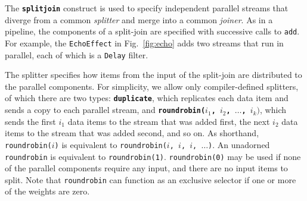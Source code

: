 
The \textbf{\texttt{splitjoin}} construct is used to specify
independent parallel streams that diverge from a common
\emph{splitter} and merge into a common \emph{joiner}.  As in a
pipeline, the components of a split-join are specified with successive
calls to \texttt{add}.  For example, the \texttt{EchoEffect} in
Fig.~\ref{fig:echo} adds two streams that run in parallel, each of
which is a \texttt{Delay} filter.

The splitter specifies how items from the input of the split-join are
distributed to the parallel components.  For simplicity, we allow only
compiler-defined splitters, of which there are two types:
\textbf{\texttt{duplicate}}, which replicates each data item and sends
a copy to each parallel stream, and \textbf{\texttt{roundrobin($i_1$,
    $i_2$, $\dots$, $i_k)$}}, which sends the first $i_1$ data items
to the stream that was added first, the next $i_2$ data items to the
stream that was added second, and so on.  As shorthand,
\texttt{roundrobin($i$)} is equivalent to \texttt{roundrobin($i$, $i$,
  $i$, $\dots$)}.  An unadorned \texttt{roundrobin} is equivalent to
\texttt{roundrobin(1)}.  \texttt{roundrobin(0)} may be used if none of
the parallel components require any input, and there are no input
items to split.  Note that \texttt{roundrobin} can function as an
exclusive selector if one or more of the weights are zero.

